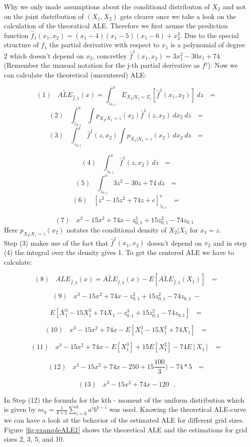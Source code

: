 \documentclass[
]{krantz}
\begin{document}
Why we only made assumptions about the conditional distributon of \(X_2\) and not on the joint distribution of \((X_1,X_2)\) gets clearer once we take a look on the calculation of the theoratical ALE. Therefore we first asume the prediction function \(\hat{f}_1 (x_1, x_2) = (x_1-4)(x_1-5)(x_1-6) + x_2^3\). Due to the special structure of \(f_1\) the partial derivative with respect to \(x_1\) is a polynomial of degree 2 which doesn't depend on \(x_2\), concretley \(\hat{f}^1(x_1,x_2) = 3x_1^2 -30x_1 +74\) (Remember the unusual notation for the j-th partial derivative as \(f^{j}\)).
Now we can calculate the theoretical (uncentered) ALE:

\[(1)~~~~\widetilde{ALE}_{\hat{f},1}(x) = \int_{z_{0,1}}^x E_{X_2\vert X_1= Z_1}[\hat{f}^1(x_1,x_2)]~dz~~~=\]
\[(2)~~~~ \int_{z_{0,1}}^x \int p_{X_2\vert X_1 = z }(x_2)\hat{f}^1(z,x_2)~dx_2~dz~~~=\]
\[(3)~~~~ \int_{z_{0,1}}^x \hat{f}^1(z,x_2)\int p_{X_2\vert X_1=z}(x_2)~dx_2~dz~~~=\]

\[(4)~~~~ \int_{z_{0,1}}^x \hat{f}^1(z,x_2)~dz~~~=\]
\[(5)~~~~ \int_{z_{0,1}}^x  3z^2 -30z +74~dz~~~=\]
\[(6)~~~~ [z^3 -15z^2 +74z + c]_{z_{0,1}}^x~~~=\]

\[(7)~~~~ x^3 -15x^2 +74x - z_{0,1} ^ 3 + 15 z_{0,1}^2 - 74z_{0,1}~~~\]
Here \(p_{X_2\vert X_1=z}(x_2)\) notates the conditional density of \(X_2\vert X_1\) for \(x_1 = z\).\\
Step (3) makes use of the fact that \(\hat{f}^1(x_1,x_2)\) doesn't depend on \(x_2\) and in step (4) the integral over the density gives 1.
To get the centered ALE we have to calculate:

\[(8)~~~~ALE_{\hat{f},1}(x) = \widetilde{ALE}_{\hat{f},1}(x) - E[\widetilde{ALE}_{\hat{f},1}(X_1)] ~~~=\]

\[(9)~~~~ x^3 - 15x^2 +74x - z_{0,1} ^ 3 + 15 z_{0,1}^2 - 74z_{0,1}  ~- \]

\[ E[X_1^3 -15X_1^2 +74X_1 - z_{0,1} ^ 3 + 15 z_{0,1}^2 - 74z_{0,1}] ~~~=\]

\[(10)~~~~ x^3 -15x^2 +74x - E[X_1^3 -15X_1^2 +74X_1] ~~~=\]

\[(11)~~~~ x^3 -15x^2 +74x - E[X_1^3] +15E[X_1^2] -74E[X_1] ~~~=\]

\[(12)~~~~ x^3 -15x^2 +74x - 250 +15 \frac{100}{3}) - 74* 5 ~~~=\]

\[(13)~~~~ x^3 -15x^2 +74x - 120~~~.\]

In Step (12) the formula for the kth - moment of the uniform distribution which is given by \(m_k = \frac{1}{k+1}\sum_{i=0}^k a^i b^{k-i}\) was used.
Knowing the theoretical ALE-curve we can have a look at the behavior of the estimated ALE for different grid sizes. Figure \ref{fig:exampleALE1} shows the theoretical ALE and the estimations for grid sizes 2, 3, 5, and 10.
\end{document}
